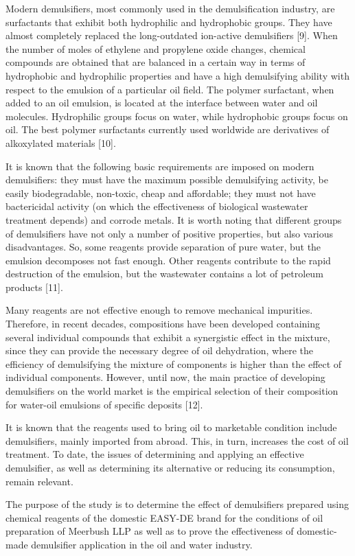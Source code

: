 Modern demulsifiers, most commonly used in the demulsification industry,
are surfactants that exhibit both hydrophilic and hydrophobic groups.
They have almost completely replaced the long-outdated ion-active
demulsifiers {[}9{]}. When the number of moles of ethylene and propylene
oxide changes, chemical compounds are obtained that are balanced in a
certain way in terms of hydrophobic and hydrophilic properties and have
a high demulsifying ability with respect to the emulsion of a particular
oil field. The polymer surfactant, when added to an oil emulsion, is
located at the interface between water and oil molecules. Hydrophilic
groups focus on water, while hydrophobic groups focus on oil. The best
polymer surfactants currently used worldwide are derivatives of
alkoxylated materials {[}10{]}.

It is known that the following basic requirements are imposed on modern
demulsifiers: they must have the maximum possible demulsifying activity,
be easily biodegradable, non-toxic, cheap and affordable; they must not
have bactericidal activity (on which the effectiveness of biological
wastewater treatment depends) and corrode metals. It is worth noting
that different groups of demulsifiers have not only a number of positive
properties, but also various disadvantages. So, some reagents provide
separation of pure water, but the emulsion decomposes not fast enough.
Other reagents contribute to the rapid destruction of the emulsion, but
the wastewater contains a lot of petroleum products {[}11{]}.

Many reagents are not effective enough to remove mechanical impurities.
Therefore, in recent decades, compositions have been developed
containing several individual compounds that exhibit a synergistic
effect in the mixture, since they can provide the necessary degree of
oil dehydration, where the efficiency of demulsifying the mixture of
components is higher than the effect of individual components. However,
until now, the main practice of developing demulsifiers on the world
market is the empirical selection of their composition for water-oil
emulsions of specific deposits {[}12{]}.

It is known that the reagents used to bring oil to marketable condition
include demulsifiers, mainly imported from abroad. This, in turn,
increases the cost of oil treatment. To date, the issues of determining
and applying an effective demulsifier, as well as determining its
alternative or reducing its consumption, remain relevant.

The purpose of the study is to determine the effect of demulsifiers
prepared using chemical reagents of the domestic EASY-DE brand for the
conditions of oil preparation of Meerbush LLP as well as to prove the
effectiveness of domestic-made demulsifier application in the oil and
water industry.

